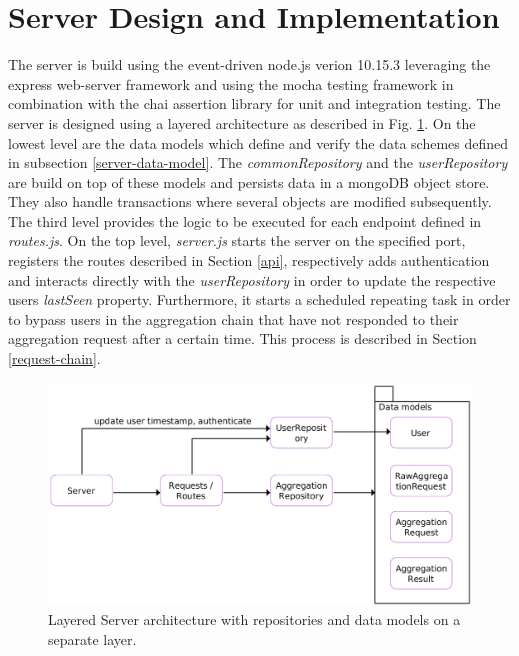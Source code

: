 \section{Server Design and Implementation}\label{server}
The server is build using the event-driven node.js verion 10.15.3 leveraging the express web-server framework \parencite{express} and using the mocha testing framework \parencite{mocha} in combination with the chai assertion library \parencite{chai} for unit and integration testing. The server is designed using a layered architecture as described in Fig. \ref{server-architecture}. On the lowest level are the data models which define and verify the data schemes defined in subsection \ref{server-data-model}. The \textit{commonRepository} and the \textit{userRepository} are build on top of these models and persists data in a mongoDB object store. They also handle transactions where several objects are modified subsequently. The third level provides the logic to be executed for each endpoint defined in \textit{routes.js}. On the top level, \textit{server.js} starts the server on the specified port, registers the routes described in Section \ref{api}, respectively adds authentication and interacts directly with the \textit{userRepository} in order to update the respective users \textit{lastSeen} property. Furthermore, it starts a scheduled repeating task in order to bypass users in the aggregation chain that have not responded to their aggregation request after a certain time. This process is described in Section \ref{request-chain}.

\begin{figure}[h!]
  \includegraphics[width=\textwidth]{data/diagrams/server-diagram.png}
  \caption{Layered Server architecture with repositories and data models on a separate layer.}
  \label{server-architecture}
\end{figure}

